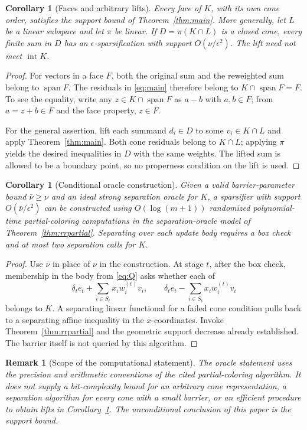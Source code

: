 \documentclass[11pt]{article}
\newtheorem{corollary}[theorem]{Corollary}
\newtheorem{remark}[theorem]{Remark}
\newcommand{\intr}{\operatorname{int}}
\newcommand{\spn}{\operatorname{span}}
\begin{document}
\begin{corollary}[Faces and arbitrary lifts]\label{cor:lifts}
Every face of $K$, with its own cone order, satisfies the support bound
of Theorem~\ref{thm:main}. More generally, let $L$ be a linear subspace
and let $\pi$ be linear. If $D=\pi(K\cap L)$ is a closed cone, every
finite sum in $D$ has an $\epsilon$-sparsification with support
$O(\nu/\epsilon^2)$. The lift need not meet $\intr K$.
\end{corollary}
\begin{proof}
For vectors in a face $F$, both the original sum and the reweighted
sum belong to $\spn F$. The residuals in \eqref{eq:main} therefore
belong to $K\cap\spn F=F$. To see the equality, write any
$z\in K\cap\spn F$ as $a-b$ with $a,b\in F$; from $a=z+b\in F$
and the face property, $z\in F$.

For the general assertion, lift each summand $d_i\in D$ to some
$v_i\in K\cap L$ and apply Theorem~\ref{thm:main}. Both cone
residuals belong to $K\cap L$; applying $\pi$ yields the desired
inequalities in $D$ with the same weights. The lifted sum is allowed
to be a boundary point, so no properness condition on the lift is used.
\end{proof}

\begin{corollary}[Conditional oracle construction]\label{cor:algorithm}
Given a valid barrier-parameter bound $\bar\nu\ge\nu$ and an ideal
strong separation oracle for $K$, a sparsifier with support
$O(\bar\nu/\epsilon^2)$ can be constructed using
$O(\log(m+1))$ randomized
polynomial-time partial-coloring computations in the separation-oracle
model of Theorem~\ref{thm:rrpartial}. Separating over each update body
requires a box check and at most two separation calls for $K$.
\end{corollary}
\begin{proof}
Use $\bar\nu$ in place of $\nu$ in the construction.
At stage $t$, after the box check, membership in the body from
\eqref{eq:Q} asks whether each of
\[
 \delta_t e_t+\sum_{i\in S_t}x_i w_i^{(t)}v_i,
 \qquad
 \delta_t e_t-\sum_{i\in S_t}x_i w_i^{(t)}v_i
\]
belongs to $K$. A separating linear functional for a failed cone
condition pulls back to a separating affine inequality in the
$x$-coordinates. Invoke Theorem~\ref{thm:rrpartial} and the geometric
support decrease already established. The barrier itself is not
queried by this algorithm.
\end{proof}

\begin{remark}[Scope of the computational statement]
The oracle statement uses the precision and arithmetic conventions of
the cited partial-coloring algorithm. It does not supply a
bit-complexity bound for an arbitrary cone representation, a
separation algorithm for every cone with a small barrier, or an
efficient procedure to obtain lifts in Corollary~\ref{cor:lifts}.
The unconditional conclusion of this paper is the support bound.
\end{remark}
\end{document}
